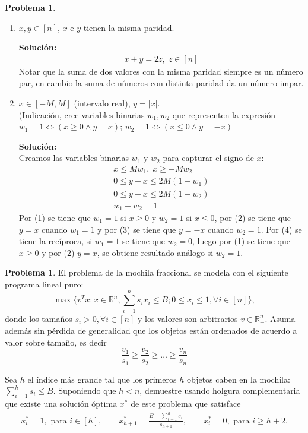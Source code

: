 \documentclass{article}
\newcommand{\RR}{\mathbb R}
\theoremstyle{plain}
\theoremstyle{definition}
\newtheorem{prob}[teo]{Problema}
\theoremstyle{Azul}
\begin{document}
\begin{prob}
\begin{enumerate}[(1)]
\item $x, y\in [n]$, $x$ e $y$ tienen la misma paridad.

\textbf{Solución:}\\
\begin{align*}
x+y=2z, \; z\in[n]
\end{align*}
Notar que la suma de dos valores con la misma paridad siempre es un número par, en cambio la suma de números con distinta paridad da un número impar.

\item $x\in [-M,M]$ (intervalo real), $y=|x|$.\\
 (Indicación, cree variables binarias $w_1, w_2$ que representen la expresión $w_1=1 \iff (x\geq 0 \wedge y=x)$; $w_2=1 \iff (x\leq 0 \wedge y=-x)$

\textbf{Solución:}\\
Creamos las variables binarias $w_{1}$ y $w_{2}$ para capturar el signo de $x$:
\begin{align}
x \leq M w_{1}, \; x\geq-Mw_{2}\\
0\leq y-x \leq 2M(1-w_{1})\\
0\leq y+x \leq 2M(1-w_{2})\\
w_{1}+w_{2}=1
\end{align}
Por (1) se tiene que $w_{1}=1$ si $x\geq0$ y $w_{2}=1$ si $x\leq0$, por (2) se tiene que $y=x$ cuando $w_{1}=1$ y por (3) se tiene que $y=-x$ cuando $w_{2}=1$. Por (4) se tiene la recíproca, si $w_{1}= 1$ se tiene que $w_{2}=0$, luego por (1) se tiene que $x\geq0$ y por (2) $y=x$, se obtiene resultado análogo si $w_{2}=1$.
\end{enumerate}
\end{prob}

\newpage

\begin{prob} El problema de la mochila fraccional se modela con el siguiente programa lineal puro:
$$\max\{v^Tx\colon x\in \RR^n, \sum_{i=1}^n s_ix_i \leq B; 0\leq x_i\leq 1, \forall i\in [n]\},$$
donde los tamaños $s_i>0, \forall i\in [n]$ y los valores son arbitrarios $v\in \RR^n_+$. Asuma además sin pérdida de generalidad que los objetos están ordenados de acuerdo a valor sobre tamaño, es decir $$\frac{v_1}{s_1}\geq \frac{v_2}{s_2}\geq \dots \geq \frac{v_n}{s_n}$$

Sea $h$ el índice más grande tal que los primeros $h$ objetos caben en la mochila: $\sum_{i=1}^h s_i \leq B$. Suponiendo que $h<n$, demuestre usando holgura complementaria que existe una solución óptima $x^*$ de este problema que satisface
\begin{align*}
x_i^*=1, \text{ para } i\in [h], \qquad x^*_{h+1}=\frac{B-\sum_{i=1}^h s_i}{s_{h+1}}, \qquad x^*_{i}=0, \text{ para }  i\geq h+2.
\end{align*}
\end{prob}
\end{document}
